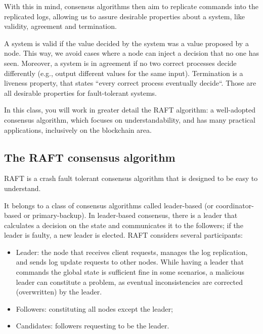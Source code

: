 \documentclass[12pt,a4paper]{article}
\begin{document}
With this in mind, consensus algorithms then aim to replicate commands into the replicated logs, allowing us to assure desirable properties about a system, like validity, agreement and termination.

A system is valid if the value decided by the system was a value proposed by a node. This way, we avoid cases where a node can inject a decision that no one has seen. Moreover, a system is in agreement if no two correct processes decide differently (e.g., output different values for the same input). Termination is a liveness property, that states ``every correct process eventually decide``. Those are all desirable properties for fault-tolerant systems. 

In this class, you will work in greater detail the RAFT algorithm: a well-adopted consensus algorithm, which focuses on understandability, and has many practical applications, inclusively on the blockchain area. 




 
\subsection{The RAFT consensus algorithm}

RAFT is a crash fault tolerant consensus algorithm that is designed to be easy to understand.  %

It belongs to a class of consensus algorithms called leader-based (or coordinator-based or primary-backup). In leader-based consensus, there is a leader that calculates a decision on the state and communicates it to the followers; if the leader is faulty, a new leader is elected.
RAFT considers several participants: 
\begin{itemize}
    \item Leader: the node that receives client requests, manages the log replication, and sends log update requests to other nodes. While having a leader that commands the global state is sufficient fine in some scenarios, a malicious leader can constitute a problem, as eventual inconsistencies are corrected (overwritten) by the leader.
    \item  Followers: constituting all nodes except the leader; 
    \item Candidates: followers requesting to be the leader.
\end{itemize}
\end{document}
